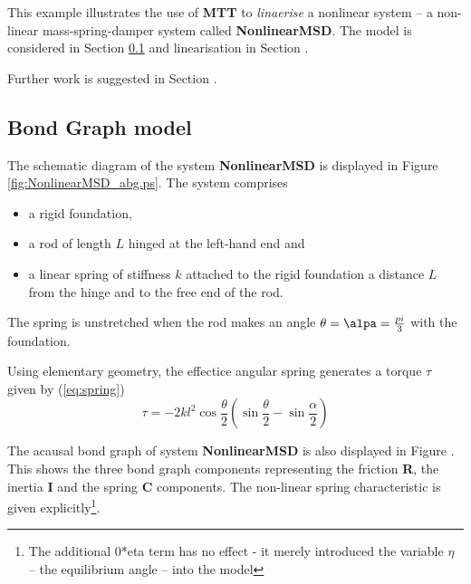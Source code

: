 

This example illustrates the use of \textbf{MTT} to \emph{linaerise} a
nonlinear system -- a non-linear mass-spring-damper system called
\textbf{NonlinearMSD}. The model is considered in Section
\ref{sec:model} and linearisation in Section .

Further work is suggested in Section .

\subsection{Bond Graph model}\label{sec:model}

The schematic diagram  of the system
\textbf{NonlinearMSD} is displayed in Figure
\ref{fig:NonlinearMSD_abg.ps}. The system comprises
\begin{itemize}
\item a rigid foundation,
\item a rod of length $L$ hinged at the left-hand end and
\item a linear spring of stiffness $k$ attached to the rigid
  foundation a distance $L$ from the hinge and to the free end of the rod.
\end{itemize}
The spring is unstretched when the rod makes an angle $\theta = \alpa
= \frac{pi}{3}$ with the foundation.

Using elementary geometry, the effectice angular spring generates a
torque $\tau$ given by (\ref{eq:spring})
\begin{equation}\label{eq:spring}
  \tau = -2kl^2 \cos{\frac{\theta}{2}} (\sin{\frac{\theta}{2}}-\sin{\frac{\alpha}{2}})
\end{equation}

The acausal bond graph of system \textbf{NonlinearMSD} is also
displayed in Figure . This shows the
three bond graph components representing the friction \textbf{R}, the
inertia \textbf{I} and the spring \textbf{C} components. The
non-linear spring characteristic is given explicitly\footnote{The
  additional 0*eta term has no effect - it merely introduced the
  variable $\eta$ -- the equilibrium angle -- into the model}.

